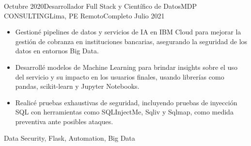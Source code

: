 \begin{experiences}
\emptySeparator
\experience
  {Octubre 2020}{Desarrollador Full Stack y Científico de Datos}{MDP CONSULTING}{Lima, PE}
  {Remoto}{Completo}
  {Julio 2021} {
    \begin{itemize}
      \item Gestioné pipelines de datos y servicios de IA en IBM Cloud para mejorar la gestión de cobranza en instituciones bancarias, asegurando la seguridad de los datos en entornos Big Data.
      \item Desarrollé modelos de Machine Learning para brindar insights sobre el uso del servicio y su impacto en los usuarios finales, usando librerías como pandas, scikit-learn y Jupyter Notebooks.
      \item Realicé pruebas exhaustivas de seguridad, incluyendo pruebas de inyección SQL con herramientas como SQLInjectMe, Sqliv y Sqlmap, como medida preventiva ante posibles ataques.
    \end{itemize}
  }
  {Data Security, Flask, Automation, Big Data}
\end{experiences}
